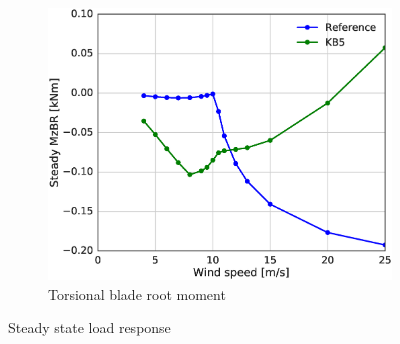 \begin{figure}[tph]
\begin{subfigure}{\textwidth}
\centering
\includegraphics[width=0.50\linewidth]{figures/KB6_final/KB5_steady_MzBR_HS2.eps}
\caption{Torsional blade root moment}
\label{subfig:KB5_Mz}
\end{subfigure}
 
\caption{Steady state load response}
\label{fig:KB5_load_response}
\end{figure}

